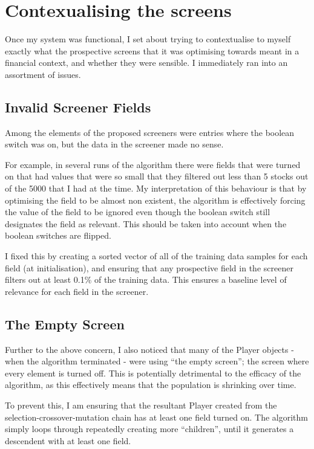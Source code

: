 \section{Contexualising the screens} \label{contextualising}
Once my system was functional, I set about trying to contextualise to myself exactly what the prospective screens that it was optimising towards meant in a financial context, and whether they were sensible. I immediately ran into an assortment of issues.

\subsection{Invalid Screener Fields} \label{invalidField}
Among the elements of the proposed screeners were entries where the boolean switch was on, but the data in the screener made no sense. \newline

For example, in several runs of the algorithm there were fields that were turned on that had values that were so small that they filtered out less than 5 stocks out of the 5000 that I had at the time. My interpretation of this behaviour is that by optimising the field to be almost non existent, the algorithm is effectively forcing the value of the field to be ignored even though the boolean switch still designates the field as relevant. This should be taken into account when the boolean switches are flipped. \newline

I fixed this by creating a sorted vector of all of the training data samples for each field (at initialisation), and ensuring that any prospective field in the screener filters out at least 0.1\% of the training data. This ensures a baseline level of relevance for each field in the screener.

\subsection{The Empty Screen} \label{emptyScreen}
Further to the above concern, I also noticed that many of the Player objects - when the algorithm terminated - were using ``the empty screen''; the screen where every element is turned off. This is potentially detrimental to the efficacy of the algorithm, as this effectively means that the population is shrinking over time. \newline

To prevent this, I am ensuring that the resultant Player created from the selection-crossover-mutation chain has at least one field turned on. The algorithm simply loops through repeatedly creating more ``children'', until it generates a descendent with at least one field.

